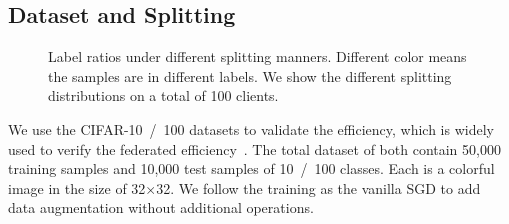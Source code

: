 \subsection{Dataset and Splitting}
\begin{figure}[t]
\vskip -0.05in
\centering
    \!\!\!\!
    \!\!\!\!
\vskip -0.1in
\caption{Label ratios under different splitting manners. Different color means the samples are in different labels. We show the different splitting distributions on a total of 100 clients.}
\label{label imbalance}
\vskip -0.1in
\end{figure}
We use the CIFAR-10\ /\ 100 datasets to validate the efficiency, which is widely used to verify the federated efficiency~\citep{mcmahan2017communication,karimireddy2020scaffold,li2020federated,xu2021fedcm,durmus2021federated,gong2022fedadmm,wang2022fedadmm,fan2022fedskip,caldarola2022improving,sun2023fedspeed,sun2023dynamic,li2023dfedadmm,fan2024locally,fan2024federated}. The total dataset of both contain 50,000 training samples and 10,000 test samples of 10\ /\ 100 classes. Each is a colorful image in the size of 32$\times$32. We follow the training as the vanilla SGD to add data augmentation without additional operations.

